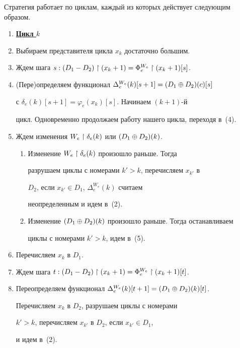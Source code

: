 Стратегия работает по циклам, каждый из которых действует следующим образом.


\pagebreak


\begin{enumerate}


\item[] \underline{\bf Цикл $k$}


\item Выбираем представителя цикла $x_k$ достаточно большим.


\item Ждем шага $s: (D_1-D_2)\restriction(x_k+1)=\Phi_e^{W_e}\restriction(x_k+1) [s]$.


\item (Пере)определяем функционал $\Delta_e^{W_e}(k)[s+1]=(D_1\oplus D_2)(c) [s]$


с $\delta_e(k)[s+1]=\varphi_e(x_k)[s]$. Начинаем $(k+1)$-й


цикл. Одновременно продолжаем работу нашего цикла, переходя в~(4).


\item Ждем изменения $W_e\restriction\delta_e(k)$ или $(D_1\oplus D_2)(k)$.


\begin{enumerate}


\item Изменение $W_e\restriction\delta_e(k)$ произошло раньше. Тогда


разрушаем циклы с номерами $k'>k$, перечисляем $x_{k'}$ в


$D_2$, если $x_{k'}\in D_1$, $\Delta_e^{W_e}(k)$ считаем


неопределенным и идем в~(2).


\item Изменение $(D_1\oplus D_2)(k)$ произошло раньше. Тогда останавливаем


циклы с номерами $k'>k$, идем в~(5).


\end{enumerate}


\item Перечисляем $x_k$ в $D_1$.


\item Ждем шага $t: (D_1-D_2)\restriction(x_k+1)= \Phi_e^{W_e}\restriction(x_k+1) [t]$.


\item Переопределяем функционал $\Delta_e^{W_e}(k)[t+1]=(D_1\oplus D_2)(k) [t]$.


Перечисляем $x_k$ в $D_2$, разрушаем циклы с номерами


$k'>k$, перечисляем $x_{k'}$ в $D_2$, если $x_{k'}\in D_1$,


и идем в~(2).


\end{enumerate}





